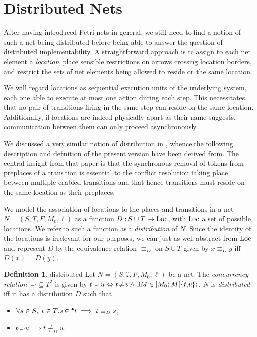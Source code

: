 \documentclass[submission,copyright,creativecommons]{eptcs}
\theoremstyle{definition}
\newtheorem{definition}{Definition}
\def\precond#1{{\vphantom{#1}}^\bullet #1}
\def\equivalent{\Leftrightarrow}
\def\defitem#1{\emph{#1}}
\def\Loc{\textrm{\upshape Loc}}
\def\concurrent{\smile}
\begin{document}
\section{Distributed Nets}\label{sec-distr}

After having introduced Petri nets in general, we still need to find a
notion of such a net being distributed before being able to answer the
question of distributed implementability. A straightforward approach is
to assign to each net element a \defitem{location}, place sensible restrictions
on arrows crossing location borders, and restrict the sets of net elements being
allowed to reside on the same location.

We will regard locations as sequential execution units of the
underlying system, each one able to execute at most one action during each step. This
necessitates that no pair of transitions firing in the same step can reside on
the same location. Additionally, if locations are indeed physically apart as
their name suggests, communication between them can only proceed asynchronously.

We discussed a very similar notion of distribution in
\cite{glabbeek08syncasyncinteraction}, whence
the following description and definition of the present version have been derived from.
The central insight from that paper is that the synchronous removal of tokens
from preplaces of a transition is essential to the conflict resolution taking
place between multiple enabled transitions and that hence transitions must
reside on the same location as their preplaces.

We model the association of locations to the places and transitions
in a net $N=(S,T,F,M_0,\ell)$ as a function $D: S\cup T \rightarrow
\Loc$, with $\Loc$ a set of possible locations.  We refer to such a
function as a \defitem{distribution} of $N$.  Since the identity of
the locations is irrelevant for our purposes, we can just as well
abstract from $\Loc$ and represent $D$ by the equivalence relation
$\equiv_D$ on $S\cup T$ given by $x \equiv_D y$ iff $D(x)=D(y)$.

\begin{definition}{distributed}{
  Let $N = (S, T, F, M_0, \ell)$ be a net.
  }
  The \defitem{concurrency relation} $\mathord{\concurrent} \!\subseteq\!
  T^2$ is given by $t \!\concurrent\! u \equivalent t \!\ne\! u \wedge \exists
  M \inp [M_0\rangle.\! M [\{t,\!u\}\rangle$.
  $N$ is \defitem{distributed} iff it has a distribution $D$ such that
  \begin{itemize}
    \item
      $\forall s \in S, ~t \in T.\hspace{1pt}s \in \precond{t} \implies t \equiv_D s$,
    \item
     $t \concurrent u \implies t\not\equiv_D u$.
  \end{itemize}
\end{definition}
\end{document}
